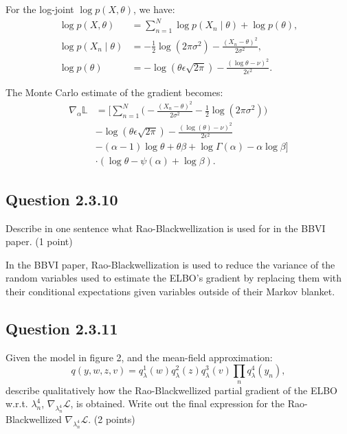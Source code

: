 \documentclass{article}
\begin{document}
\begin{multicols}{2}
For the log-joint \(\log p(X, \theta)\), we have:
\begin{align*}
    \log p(X, \theta) &= \sum_{n=1}^{N} \log p(X_n \mid \theta) + \log p(\theta), \\
    \log p(X_n \mid \theta) &= -\frac{1}{2} \log(2\pi\sigma^2) - \frac{(X_n - \theta)^2}{2\sigma^2}, \\
    \log p(\theta) &= -\log(\theta \epsilon \sqrt{2\pi}) - \frac{(\log \theta - \nu)^2}{2\epsilon^2}.
\end{align*}

The Monte Carlo estimate of the gradient becomes:
\begin{align*}
    \widehat{\nabla_\alpha \mathbb{L}} &= \Bigg[\sum_{n=1}^N \Big(-\frac{(X_n - \theta)^2}{2\sigma^2} - \frac{1}{2} \log(2\pi\sigma^2)\Big) \\&
    - \log(\theta \epsilon \sqrt{2\pi}) - \frac{(\log(\theta) - \nu)^2}{2\epsilon^2} \\
    &- (\alpha - 1)\log \theta + \theta \beta + \log \Gamma(\alpha) - \alpha \log \beta \Bigg]\\& \cdot (\log \theta - \psi(\alpha) + \log \beta).
\end{align*}

\subsection*{Question 2.3.10}
Describe in one sentence what Rao-Blackwellization is used for in the BBVI paper. (1 point)\bigskip 

In the BBVI paper, Rao-Blackwellization is used to reduce the variance of the random variables used to estimate the ELBO's gradient by replacing them with their conditional expectations given variables outside of their Markov blanket.


\subsection*{Question 2.3.11}
Given the model in figure 2, and the mean-field approximation:  
\[
q(y, w, z, v) = q_\lambda^1(w)q_\lambda^2(z)q_\lambda^3(v)\prod_n q_\lambda^4(y_n),
\]
describe qualitatively how the Rao-Blackwellized partial gradient of the ELBO w.r.t. \(\lambda_n^4\), \(\nabla_{\lambda_n^4} \mathcal{L}\), is obtained. Write out the final expression for the Rao-Blackwellized \(\nabla_{\lambda_n^4} \mathcal{L}\). (2 points)







\end{multicols}

\clearpage
{}
\printbibliography{}
\end{document}
